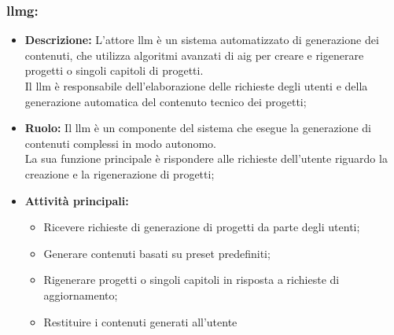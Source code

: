\subsubsection*{\gls{llmg}:}

\begin{itemize}
    \item \textbf{Descrizione:}  L'attore \gls{llm} è un sistema automatizzato di generazione dei contenuti, che utilizza algoritmi avanzati di \gls{aig} per creare e rigenerare progetti o singoli capitoli di progetti. \\
    Il \gls{llm} è responsabile dell'elaborazione delle richieste degli utenti e della generazione automatica del contenuto tecnico dei progetti;
    \item \textbf{Ruolo:}  Il \gls{llm} è un componente del sistema che esegue la generazione di contenuti complessi in modo autonomo.\\
    La sua funzione principale è rispondere alle richieste dell'utente riguardo la creazione e la rigenerazione di progetti;
    \item \textbf{Attività principali:}
        \begin{itemize}
            \item Ricevere richieste di generazione di progetti da parte degli utenti;
            \item Generare contenuti basati su preset predefiniti;
            \item Rigenerare progetti o singoli capitoli in risposta a richieste di aggiornamento;
            \item Restituire i contenuti generati all'utente
        \end{itemize}
\end{itemize}



